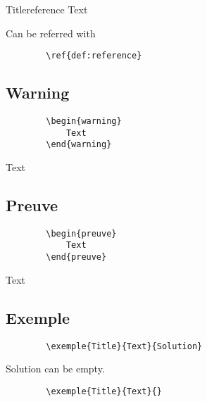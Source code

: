 \documentclass[french]{article}
\begin{document}
    \begin{definition}{Title}{reference}
        Text
    \end{definition}

    Can be referred with 
    \begin{verbatim} 
        \ref{def:reference}
    \end{verbatim}

    \subsection{Warning}

    \begin{verbatim}
        \begin{warning}
            Text
        \end{warning}
    \end{verbatim}

    \begin{warning}
        Text
    \end{warning}

    \subsection{Preuve}

    \begin{verbatim}
        \begin{preuve}
            Text
        \end{preuve}
    \end{verbatim}

    \begin{preuve}
        Text
    \end{preuve}

    \subsection{Exemple}
    

    \begin{verbatim}
        \exemple{Title}{Text}{Solution}
    \end{verbatim}


    \begin{warning}
        Solution can be empty.
    \end{warning}
    
    \begin{verbatim}
        \exemple{Title}{Text}{}
    \end{verbatim}
\end{document}
